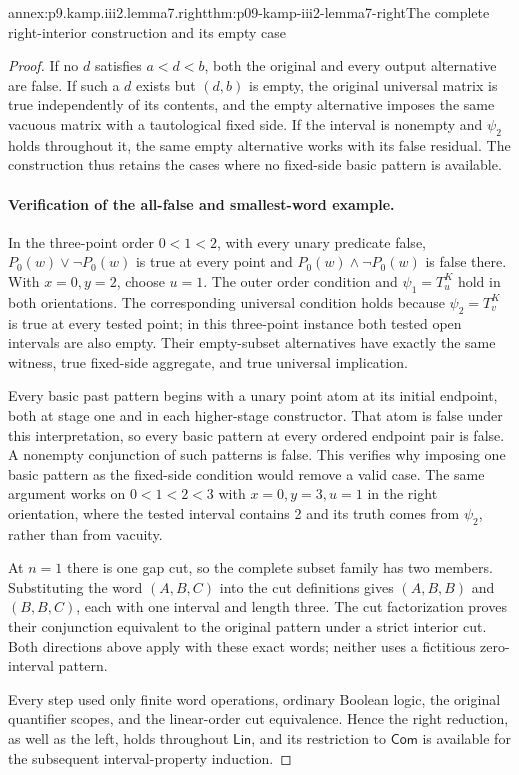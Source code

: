 \begin{annexitem}{annex:p9.kamp.iii2.lemma7.right}{thm:p09-kamp-iii2-lemma7-right}{The complete right-interior construction and its empty case}
\begin{proof}
If no \(d\) satisfies \(a<d<b\), both the original and every
output alternative are false. If such a \(d\) exists but
\((d,b)\) is empty, the original universal matrix is true
independently of its contents, and the empty alternative imposes the
same vacuous matrix with a tautological fixed side. If the interval
is nonempty and \(\psi_2\) holds throughout it, the same empty
alternative works with its false residual. The construction thus
retains the cases where no fixed-side basic pattern is available.

\paragraph{Verification of the all-false and smallest-word example.}
In the three-point order \(0<1<2\), with every unary predicate
false, \(P_0(w)\lor\neg P_0(w)\) is true at every point and
\(P_0(w)\land\neg P_0(w)\) is false there. With \(x=0,y=2\),
choose \(u=1\). The outer order condition and \(\psi_1=T^K_u\)
hold in both orientations. The corresponding universal condition
holds because \(\psi_2=T^K_v\) is true at every tested point;
in this three-point instance both tested open intervals are also empty.
Their empty-subset alternatives have exactly the same witness,
true fixed-side aggregate, and true universal implication.

Every basic past pattern begins with a unary point atom at its initial
endpoint, both at stage one and in each higher-stage constructor.
That atom is false under this interpretation, so every basic pattern
at every ordered endpoint pair is false. A nonempty conjunction of
such patterns is false. This verifies why imposing one basic pattern
as the fixed-side condition would remove a valid case. The same
argument works on \(0<1<2<3\) with \(x=0,y=3,u=1\) in the
right orientation, where the tested interval contains 2 and its
truth comes from \(\psi_2\), rather than from vacuity.

At \(n=1\) there is one gap cut, so the complete subset family
has two members. Substituting the word \((A,B,C)\) into the
cut definitions gives \((A,B,B)\) and \((B,B,C)\), each
with one interval and length three. The cut factorization proves
their conjunction equivalent to the original pattern under a strict
interior cut. Both directions above apply with these exact words;
neither uses a fictitious zero-interval pattern.

Every step used only finite word operations, ordinary Boolean logic,
the original quantifier scopes, and the linear-order cut equivalence.
Hence the right reduction, as well as the left, holds throughout
\(\mathsf{Lin}\), and its restriction to \(\mathsf{Com}\)
is available for the subsequent interval-property induction.
\end{proof}
\end{annexitem}

